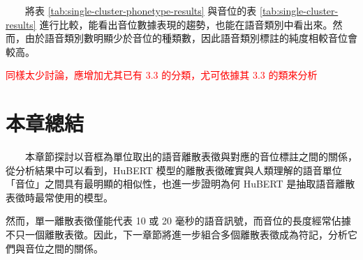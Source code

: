 

　　將表 \ref{tab:single-cluster-phonetype-results} 與音位的表 \ref{tab:single-cluster-results} 進行比較，能看出音位數據表現的趨勢，也能在語音類別中看出來。然而，由於語音類別數明顯少於音位的種類數，因此語音類別標註的純度相較音位會較高。

\textcolor{red}{同樣太少討論，應增加尤其已有 3.3 的分類，尤可依據其 3.3 的類來分析}

\section{本章總結}

　　本章節探討以音框為單位取出的語音離散表徵與對應的音位標註之間的關係，從分析結果中可以看到，HuBERT 模型的離散表徵確實與人類理解的語音單位「音位」之間具有最明顯的相似性，也進一步證明為何 HuBERT 是抽取語音離散表徵時最常使用的模型。

        然而，單一離散表徵僅能代表 10 或 20 毫秒的語音訊號，而音位的長度經常佔據不只一個離散表徵。因此，下一章節將進一步組合多個離散表徵成為符記，分析它們與音位之間的關係。
